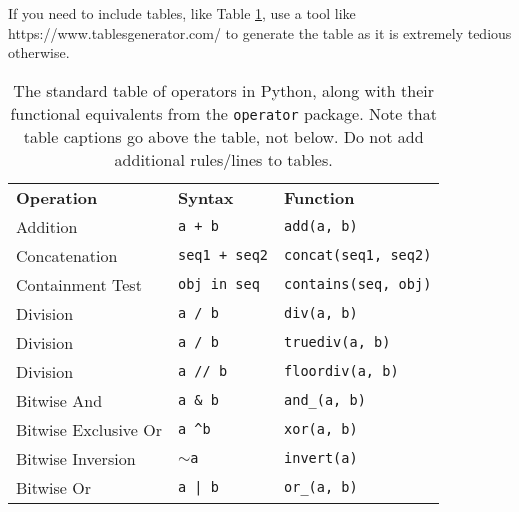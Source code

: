 \documentclass{l4proj}
\begin{document}

If you need to include tables, like Table \ref{tab:operators}, use a tool like https://www.tablesgenerator.com/ to generate the table as it is
extremely tedious otherwise. 

\begin{table}[]
    \caption{The standard table of operators in Python, along with their functional equivalents from the \texttt{operator} package. Note that table
    captions go above the table, not below. Do not add additional rules/lines to tables. }\label{tab:operators}
    \begin{tabular}{@{}lll@{}}
    \textbf{Operation}    & \textbf{Syntax}                & \textbf{Function}                            \\ %
    Addition              & \texttt{a + b}                          & \texttt{add(a, b)}                                    \\
    Concatenation         & \texttt{seq1 + seq2}                    & \texttt{concat(seq1, seq2)}                           \\
    Containment Test      & \texttt{obj in seq}                     & \texttt{contains(seq, obj)}                           \\
    Division              & \texttt{a / b}                          & \texttt{div(a, b) }  \\
    Division              & \texttt{a / b}                          & \texttt{truediv(a, b) } \\
    Division              & \texttt{a // b}                         & \texttt{floordiv(a, b)}                               \\
    Bitwise And           & \texttt{a \& b}                         & \texttt{and\_(a, b)}                                  \\
    Bitwise Exclusive Or  & \texttt{a \textasciicircum b}           & \texttt{xor(a, b)}                                    \\
    Bitwise Inversion     & \texttt{$\sim$a}                        & \texttt{invert(a)}                                    \\
    Bitwise Or            & \texttt{a | b}                          & \texttt{or\_(a, b)}                                   \\

\end{tabular}
\end{table}
\end{document}
